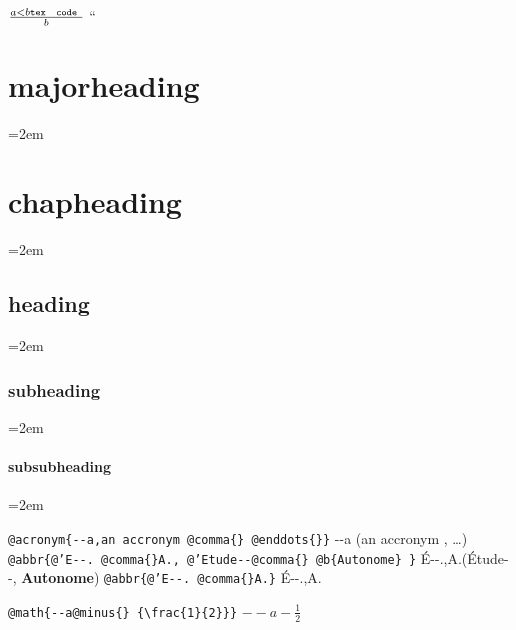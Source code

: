 \documentclass{book}
\newcommand{\GNUTexinfoplaceholder}[1]{}
\newcommand{\GNUTexinfonopagebreakheading}[2]{\let\clearpage\relax \let\cleardoublepage\relax \let\thispagestyle\GNUTexinfoplaceholder #1{#2}}
\begin{document}
$\frac{a < b \texttt{tex \hbox{ code }}}{b}$ ``

\endgroup{}%
\GNUTexinfonopagebreakheading{\chapter*}{majorheading}
\par\begingroup\obeylines\obeyspaces\frenchspacing\leftskip=2em\relax\parskip=0pt\relax\ttfamily{}%

\endgroup{}%
\GNUTexinfonopagebreakheading{\chapter*}{chapheading}
\par\begingroup\obeylines\obeyspaces\frenchspacing\leftskip=2em\relax\parskip=0pt\relax\ttfamily{}%

\endgroup{}%
\GNUTexinfonopagebreakheading{\section*}{heading}
\par\begingroup\obeylines\obeyspaces\frenchspacing\leftskip=2em\relax\parskip=0pt\relax\ttfamily{}%

\endgroup{}%
\GNUTexinfonopagebreakheading{\subsection*}{subheading}
\par\begingroup\obeylines\obeyspaces\frenchspacing\leftskip=2em\relax\parskip=0pt\relax\ttfamily{}%

\endgroup{}%
\GNUTexinfonopagebreakheading{\subsubsection*}{subsubheading}
\par\begingroup\obeylines\obeyspaces\frenchspacing\leftskip=2em\relax\parskip=0pt\relax\ttfamily{}%


\texttt{@acronym\{{-}{-}a,an accronym @comma\{\} @enddots\{\}\}} {-}{-}a (an accronym , \dots{})
\texttt{@abbr\{@'E{-}{-}. @comma\{\}A., @'Etude{-}{-}@comma\{\} @b\{Autonome\} \}} \'{E}{-}{-}.\@ ,A.\@ (\'{E}tude{-}{-}, \textbf{Autonome})
\texttt{@abbr\{@'E{-}{-}. @comma\{\}A.\}} \'{E}{-}{-}.\@ ,A.\@

\texttt{@math\{{-}{-}a@minus\{\} \{\textbackslash{}frac\{1\}\{2\}\}\}} $--a- {\frac{1}{2}}$
\end{document}
